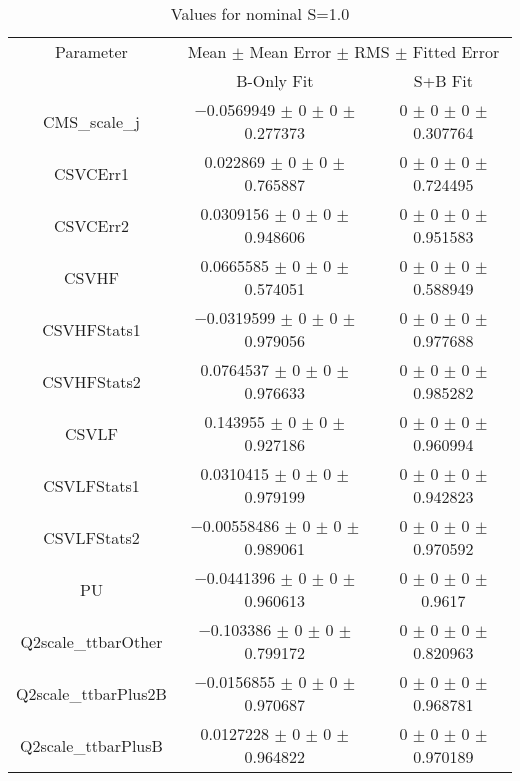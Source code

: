 \begin{table}
\centering
\caption{Values for nominal S=1.0}
\begin{tabular}{ccc}
\toprule
Parameter & \multicolumn{2}{c}{Mean $\pm$ Mean Error $\pm$ RMS $\pm$ Fitted Error}\\
 & B-Only Fit & S+B Fit\\
\midrule
CMS\_scale\_j & \num{-0.0569949} $\pm$ \num{0} $\pm$ \num{0} $\pm$ \num{0.277373} & \num{0} $\pm$ \num{0} $\pm$ \num{0} $\pm$ \num{0.307764}\\
CSVCErr1 & \num{0.022869} $\pm$ \num{0} $\pm$ \num{0} $\pm$ \num{0.765887} & \num{0} $\pm$ \num{0} $\pm$ \num{0} $\pm$ \num{0.724495}\\
CSVCErr2 & \num{0.0309156} $\pm$ \num{0} $\pm$ \num{0} $\pm$ \num{0.948606} & \num{0} $\pm$ \num{0} $\pm$ \num{0} $\pm$ \num{0.951583}\\
CSVHF & \num{0.0665585} $\pm$ \num{0} $\pm$ \num{0} $\pm$ \num{0.574051} & \num{0} $\pm$ \num{0} $\pm$ \num{0} $\pm$ \num{0.588949}\\
CSVHFStats1 & \num{-0.0319599} $\pm$ \num{0} $\pm$ \num{0} $\pm$ \num{0.979056} & \num{0} $\pm$ \num{0} $\pm$ \num{0} $\pm$ \num{0.977688}\\
CSVHFStats2 & \num{0.0764537} $\pm$ \num{0} $\pm$ \num{0} $\pm$ \num{0.976633} & \num{0} $\pm$ \num{0} $\pm$ \num{0} $\pm$ \num{0.985282}\\
CSVLF & \num{0.143955} $\pm$ \num{0} $\pm$ \num{0} $\pm$ \num{0.927186} & \num{0} $\pm$ \num{0} $\pm$ \num{0} $\pm$ \num{0.960994}\\
CSVLFStats1 & \num{0.0310415} $\pm$ \num{0} $\pm$ \num{0} $\pm$ \num{0.979199} & \num{0} $\pm$ \num{0} $\pm$ \num{0} $\pm$ \num{0.942823}\\
CSVLFStats2 & \num{-0.00558486} $\pm$ \num{0} $\pm$ \num{0} $\pm$ \num{0.989061} & \num{0} $\pm$ \num{0} $\pm$ \num{0} $\pm$ \num{0.970592}\\
PU & \num{-0.0441396} $\pm$ \num{0} $\pm$ \num{0} $\pm$ \num{0.960613} & \num{0} $\pm$ \num{0} $\pm$ \num{0} $\pm$ \num{0.9617}\\
Q2scale\_ttbarOther & \num{-0.103386} $\pm$ \num{0} $\pm$ \num{0} $\pm$ \num{0.799172} & \num{0} $\pm$ \num{0} $\pm$ \num{0} $\pm$ \num{0.820963}\\
Q2scale\_ttbarPlus2B & \num{-0.0156855} $\pm$ \num{0} $\pm$ \num{0} $\pm$ \num{0.970687} & \num{0} $\pm$ \num{0} $\pm$ \num{0} $\pm$ \num{0.968781}\\
Q2scale\_ttbarPlusB & \num{0.0127228} $\pm$ \num{0} $\pm$ \num{0} $\pm$ \num{0.964822} & \num{0} $\pm$ \num{0} $\pm$ \num{0} $\pm$ \num{0.970189}\\

\end{tabular}
\end{table}
